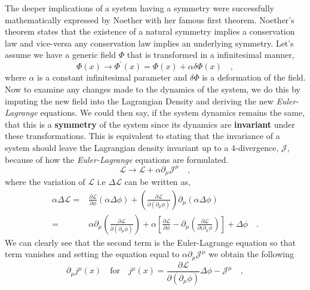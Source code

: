 \documentclass[12pt]{article}
\begin{document}
The deeper implications of a system having a symmetry were successfully mathematically expressed by Noether with her famous first theorem. Noether's theorem states that the existence of a natural symmetry implies a conservation law and vice-versa any conservation law implies an underlying symmetry.
%
Let's assume we have a generic field $\Phi$ that is transformed in a infinitesimal manner, 
%
\begin{equation}
\Phi(x) \longrightarrow \Phi^\prime (x) = \Phi(x) + \alpha \delta \Phi (x) \quad , 
\end{equation}
%
where $\alpha$ is a constant infinitesimal parameter and $\delta \Phi$ is a deformation of the field. Now to examine any changes made to the dynamics of the system, we do this by imputing the new field into the Lagrangian Density and deriving the new \textit{Euler-Lagrange} equations. We could then say, if the system dynamics remains the same, that this is a \textbf{symmetry} of the system since its dynamics are \textbf{invariant} under these transformations.
%
This is equivalent to stating that the invariance of a system should leave the Lagrangian density invariant up to a 4-divergence, $\mathcal{J}$, because of how the \textit{Euler-Lagrange} equations are formulated. 
%
\begin{equation}
\mathcal{L} \rightarrow \mathcal{L} + \alpha \partial_\mu \mathcal{J}^\mu \quad , 
\end{equation}
%
where the variation of $\mathcal{L}$ i.e $\Delta \mathcal{L}$ can be written as,
%
\begin{align}
\alpha \Delta \mathcal{L} = & \frac{\partial \mathcal{L}}{\partial \phi} \left( \alpha \Delta \phi \right) + \left( \frac{\partial \mathcal{L}}{\partial (\partial_\mu \phi)} \right) \partial_\mu (\alpha \Delta \phi) \nonumber \\
 = & \alpha \partial_\mu \left( \frac{\partial \mathcal{L}}{\partial ( \partial_\mu \phi)} \right) + \alpha \left[ \frac{\partial \mathcal{L}}{\partial \phi} - \partial_\mu \left( \frac{\partial \mathcal{L}}{\partial(\partial_\mu \phi} \right) \right] + \Delta \phi \quad  . 
\end{align}
%
We can clearly see that the second term is the Euler-Lagrange equation so that term vanishes and setting the equation equal to $\alpha \partial_\mu \mathcal{J}^\mu $ we obtain the following 
%
\begin{equation}
\partial_\mu j^\mu (x) \quad \text{for} \quad j^\mu (x) = \frac{\partial \mathcal{L}}{\partial ( \partial_\mu \phi)}  \Delta \phi -\mathcal{J}^\mu  \quad , 
\end{equation}
\end{document}

